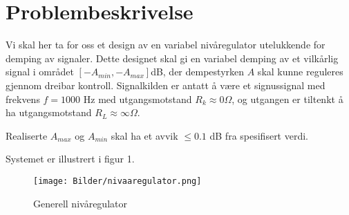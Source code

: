 \section{Problembeskrivelse}
\label{problemBeskrivelse}

Vi skal her ta for oss et design av en variabel nivåregulator utelukkende for demping av signaler.
Dette designet skal gi en variabel demping av et vilkårlig signal i området $[-A_{min}, -A_{max}]$dB,
der dempestyrken $A$ skal kunne reguleres gjennom dreibar kontroll. Signalkilden er antatt å være 
et signussignal med frekvens $f = 1000$ Hz med utgangsmotstand $R_k \approx 0\Omega$, og utgangen 
er tiltenkt å ha utgangsmotstand $R_L \approx \infty\Omega$. 

Realiserte $A_{max}$ og $A_{min}$ skal ha et 
avvik $\leq 0.1$ dB fra spesifisert verdi.

Systemet er illustrert i figur 1.

\begin{figure}[H]
    \centering
    \texttt{[image: Bilder/nivaaregulator.png]}
    \caption{Generell nivåregulator \cite{teknot}}
    \label{fig:nivaaregulator}
\end{figure}
